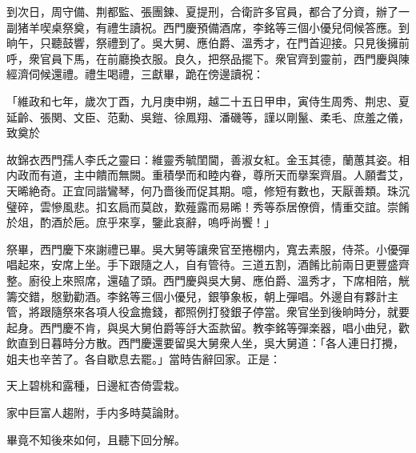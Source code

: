 到次日，周守備、荆都監、張團鍊、夏提刑，合衛許多官員，都合了分資，辦了一副猪羊喫桌祭奠，有禮生讀祝。西門慶預備酒席，李銘等三個小優兒伺候答應。到晌午，只聽鼓響，祭禮到了。吳大舅、應伯爵、溫秀才，在門首迎接。只見後擁前呼，衆官員下馬，在前廳換衣服。良久，把祭品擺下。衆官齊到靈前，西門慶與陳經濟伺候還禮。禮生喝禮，三獻畢，跪在傍邊讀祝：

\begin{myquote}
「維政和七年，歲次丁酉，九月庚申朔，越二十五日甲申，寅侍生周秀、荆忠、夏延齡、張関、文臣、范勳、吳鎧、徐鳳翔、潘磯等，謹以剛鬣、柔毛、庶羞之儀，致奠於

故錦衣西門孺人李氏之靈曰：維靈秀毓閨閫，善淑女紅。金玉其德，蘭蕙其姿。相内政而有道，主中饋而無闕。重積學而和睦内眷，尊所天而擧案齊眉。人願耆艾，天晞絶奇。正宜同諧鸞琴，何乃嗇後而促其期。噫，修短有數也，天厭善類。珠沉璧碎，雲慘風悲。扣玄扃而莫啟，歎薤露而易晞！秀等忝居僚儕，情重交誼。崇餚於俎，酌酒於巵。庶乎來享，鑒此哀辭，嗚呼尚饗！」
\end{myquote}

祭畢，西門慶下來謝禮已畢。吳大舅等讓衆官至捲棚内，寬去素服，侍茶。小優彈唱起來，安席上坐。手下跟隨之人，自有管待。三道五割，酒餚比前兩日更豐盛齊整。廚役上來照席，還磕了頭。西門慶與吳大舅、應伯爵、溫秀才，下席相陪，觥籌交錯，慇勤勸酒。李銘等三個小優兒，銀箏象板，朝上彈唱。外邊自有夥計主管，將跟隨祭來各項人役盒擔錢，都照例打發銀子停當。衆官坐到後晌時分，就要起身。西門慶不肯，與吳大舅伯爵等㧱大盃款留。教李銘等彈楽器，唱小曲兒，歡飲直到日暮時分方散。西門慶還要留吳大舅衆人坐，吳大舅道：「各人連日打攪，姐夫也辛苦了。各自歇息去罷。」當時告辭回家。正是：

\begin{myquote}
天上碧桃和露種，日邊紅杏倚雲栽。

家中巨富人趨附，手内多時莫論財。
\end{myquote}

畢竟不知後來如何，且聽下回分解。

